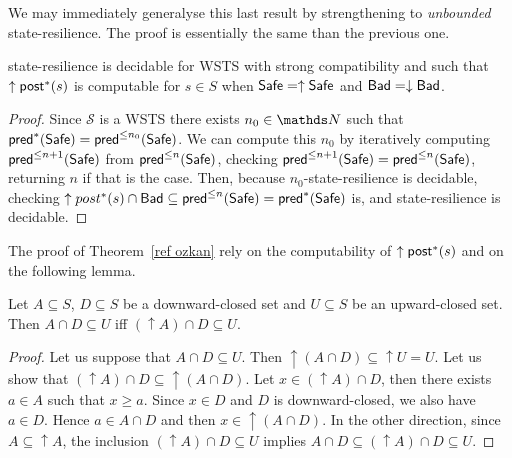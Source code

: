 We may immediately generalyse this last result by strengthening to \emph{unbounded} state-resilience. The proof is essentially the same than the previous one.

\begin{corollary}\label{postcomputable}
{\sc state-resilience} is decidable for WSTS with strong compatibility and such that $\uparrow \textsf{post}^*(s)$ is computable for $s \in S$
when
$\textsf{Safe}=\uparrow \textsf{Safe}$
and $\textsf{Bad}=\downarrow \textsf{Bad}$.
\end{corollary}

\begin{proof}
Since $\mathscr{S}$ is a WSTS there exists $n_0 \in \N$ such that
$\textsf{pred}^*(\textsf{Safe}) =  \textsf{pred}^{\leq n_0}(\textsf{Safe})$. We can compute this $n_0$ by iteratively computing 
$\textsf{pred}^{\leq n+1}(\textsf{Safe})$ from $\textsf{pred}^{\leq n}(\textsf{Safe})$, checking 
$\textsf{pred}^{\leq n+1}(\textsf{Safe}) = \textsf{pred}^{\leq n}(\textsf{Safe})$, 
returning $n$ if that is the case.
Then, because $n_0$-state-resilience is decidable, 
checking $\uparrow post^*(s) \cap \textsf{Bad} \subseteq \textsf{pred}^{\leq n}(\textsf{Safe}) = \textsf{pred}^*(\textsf{Safe})$ is,
and state-resilience is decidable.
\end{proof}

The proof of Theorem~\ref{ref ozkan} rely on the computability of $\uparrow \textsf{post}^*(s)$ and on the following lemma.

\begin{lemma}\label{Lemma intersection}
Let $A \subseteq S$, $D \subseteq S$ be a downward-closed set and $U \subseteq S$ be an upward-closed set. 
Then $A \cap D \subseteq U$  iff $ (\uparrow  A) \cap D \subseteq U$.
\end{lemma}


\begin{proof}
Let us suppose that $A \cap D \subseteq U$. Then ${\uparrow (A \cap D)} \subseteq {\uparrow U} = U$.
Let us show that $({\uparrow A}) \cap D \subseteq {\uparrow (A \cap D)}$.
Let $x \in ({\uparrow A}) \cap D$, then there exists $a \in A$ such that $x \geq a$.
Since $x \in D$ and $D$ is downward-closed, we also have $a \in D$.
Hence $a \in A \cap D$ and then $x \in { \uparrow (A \cap D)}$.
In the other direction,
since $A \subseteq {\uparrow A}$, the inclusion
$({\uparrow  A}) \cap D \subseteq U$ implies
$A \cap D \subseteq ({\uparrow  A}) \cap D \subseteq U$.
\end{proof}

\iffalse
\alain{definir downward reachability problem.....
downward-closed problem given a state $s$ of a WSTS
with strong compatibility 
and a decidable downward-closed set $D$, it can be decided whether $\exists s' \in D ~ s \to^* s'$. }
\fi



